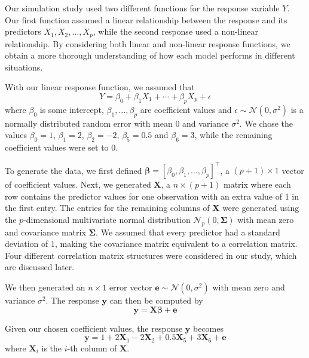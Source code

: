 \documentclass{article}
\begin{document}
	Our simulation study used two different functions for the response variable $Y$. Our first function assumed a linear relationship between the response and its predictors $X_1, X_2, \dotsc, X_p$, while the second response used a non-linear relationship. By considering both linear and non-linear response functions, we obtain a more thorough understanding of how each model performs in different situations.
	
	With our linear response function, we assumed that
	\begin{equation}
		Y = \beta_0 + \beta_1 X_1 + \cdots + \beta_p X_p + \epsilon
	\end{equation}
	where $\beta_0$ is some intercept, $\beta_1, \dotsc, \beta_p$ are coefficient values and $\epsilon\sim \mathcal{N}(0, \sigma^2)$ is a normally distributed random error with mean 0 and variance $\sigma^2$. We chose the values $\beta_0 = 1$, $\beta_1 = 2$, $\beta_2 = -2$, $\beta_5=0.5$ and $\beta_6 = 3$, while the remaining coefficient values were set to 0.
	
	To generate the data, we first defined $\bm{\beta} = [\beta_0, \beta_1, \dotsc, \beta_p]^\top$, a $(p + 1)\times 1$ vector of coefficient values. Next, we generated $\mathbf{X}$, a $n\times (p + 1)$ matrix where each row contains the predictor values for one observation with an extra value of 1 in the first entry. The entries for the remaining columns of $\mathbf{X}$ were generated using the $p$-dimensional multivariate normal distribution $\mathcal{N}_p(0, \mathbf{\Sigma})$ with mean zero and covariance matrix $\mathbf{\Sigma}$. We assumed that every predictor had a standard deviation of 1, making the covariance matrix equivalent to a correlation matrix. Four different correlation matrix structures were considered in our study, which are discussed later.
	
	We then generated an $n\times 1$ error vector $\mathbf{e}\sim \mathcal{N}(0, \sigma^2)$ with mean zero and variance $\sigma^2$. The response $\mathbf{y}$ can then be computed by
	\begin{equation}
		\mathbf{y} = \mathbf{X}\bm{\beta} + \mathbf{e}
	\end{equation}
	
	Given our chosen coefficient values, the response $\mathbf{y}$ becomes
	\begin{equation}\label{eqn:linear-response}
		\mathbf{y} = 1 + 2\mathbf{X}_1 - 2\mathbf{X}_2 + 0.5\mathbf{X}_5 + 3\mathbf{X}_6 + \mathbf{e}
	\end{equation}
	where $\mathbf{X}_i$ is the $i$-th column of $\mathbf{X}$.
	
\end{document}
